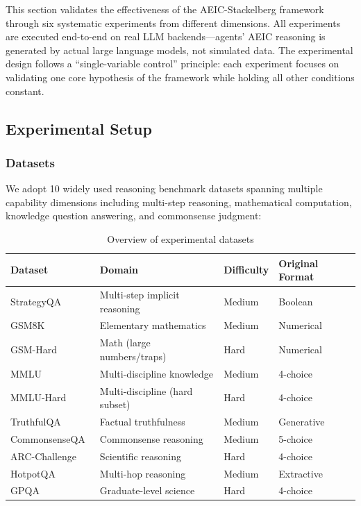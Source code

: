 \documentclass[12pt,a4paper]{article}
\begin{document}
This section validates the effectiveness of the AEIC-Stackelberg framework through six systematic experiments from different dimensions. All experiments are executed end-to-end on real LLM backends---agents' AEIC reasoning is generated by actual large language models, not simulated data. The experimental design follows a ``single-variable control'' principle: each experiment focuses on validating one core hypothesis of the framework while holding all other conditions constant.

\subsection{Experimental Setup}\label{sec:setup}

\subsubsection{Datasets}

We adopt 10 widely used reasoning benchmark datasets spanning multiple capability dimensions including multi-step reasoning, mathematical computation, knowledge question answering, and commonsense judgment:

\begin{table}[H]
\centering
\caption{Overview of experimental datasets}\label{tab:datasets}
\begin{tabular}{llll}
\toprule
Dataset & Domain & Difficulty & Original Format \\
\midrule
StrategyQA~\cite{geva2021strategyqa} & Multi-step implicit reasoning & Medium & Boolean \\
GSM8K~\cite{cobbe2021gsm8k} & Elementary mathematics & Medium & Numerical \\
GSM-Hard~\cite{gao2023gsmhard} & Math (large numbers/traps) & Hard & Numerical \\
MMLU~\cite{hendrycks2021mmlu} & Multi-discipline knowledge & Medium & 4-choice \\
MMLU-Hard~\cite{wang2024mmlupro} & Multi-discipline (hard subset) & Hard & 4-choice \\
TruthfulQA~\cite{lin2022truthfulqa} & Factual truthfulness & Medium & Generative \\
CommonsenseQA~\cite{talmor2019commonsenseqa} & Commonsense reasoning & Medium & 5-choice \\
ARC-Challenge~\cite{clark2018arc} & Scientific reasoning & Hard & 4-choice \\
HotpotQA~\cite{yang2018hotpotqa} & Multi-hop reasoning & Medium & Extractive \\
GPQA~\cite{rein2024gpqa} & Graduate-level science & Hard & 4-choice \\
\bottomrule
\end{tabular}
\end{table}
\end{document}
